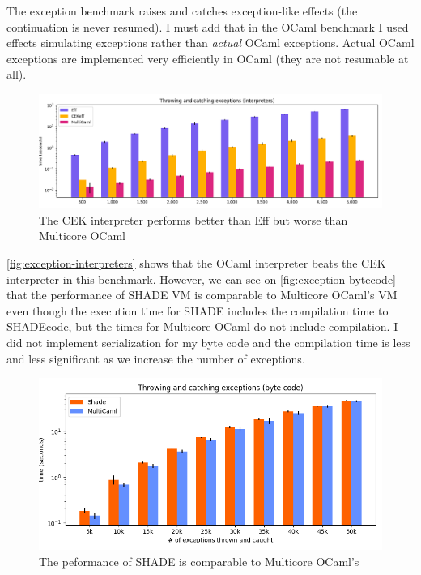 \documentclass[class=article, crop=false]{standalone}
\begin{document}
The exception benchmark raises and catches exception-like effects (the
continuation is never resumed). I must add that in the OCaml benchmark I used
effects simulating exceptions rather than \emph{actual} OCaml exceptions. Actual
OCaml exceptions are implemented very efficiently in OCaml (they are not
resumable at all).

\begin{figure}
    \centering
    \includegraphics[width=40em]{eval_plots/interp_exception.png}
    \caption{The CEK interpreter performs better than Eff but worse than
    Multicore OCaml}
    \label{fig:exception-interpreters}
\end{figure}

\autoref{fig:exception-interpreters} shows that the OCaml interpreter beats
the CEK interpreter in this benchmark. However, we can see on
\autoref{fig:exception-bytecode} that the performance of SHADE VM is
comparable to Multicore OCaml's VM even though the
execution time for SHADE includes the compilation time to SHADEcode,
but the times for Multicore OCaml do not include compilation. I did not implement
serialization for my byte code and the compilation time is less and less
significant as we increase the number of exceptions.

\begin{figure}
    \centering
    \includegraphics[width=35em]{eval_plots/comp_exception.png}
    \caption{The peformance of SHADE is comparable to Multicore OCaml's}
    \label{fig:exception-bytecode}
\end{figure}
\end{document}
